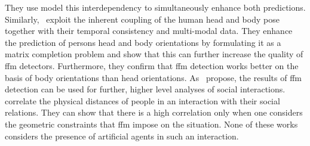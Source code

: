They use model this interdependency to simultaneously enhance both predictions.
Similarly,~ exploit the inherent coupling of the human head and body pose together with their temporal consistency and multi-modal data.
They enhance the prediction of persons head and body orientations by formulating it as a matrix completion problem and show that this can further increase the quality of \gls{ffm} detectors.
Furthermore, they confirm that \gls{ffm} detection works better on the basis of body orientations than head orientations. 
As~ propose, the results of \gls{ffm} detection can be used for further, higher level analyses of social interactions.
 correlate the physical distances of people in an interaction with their social relations.
They can show that there is a high correlation only when one considers the geometric constraints that \gls{ffm} impose on the situation.
None of these works considers the presence of \glspl{artificial agent} in such an interaction.

